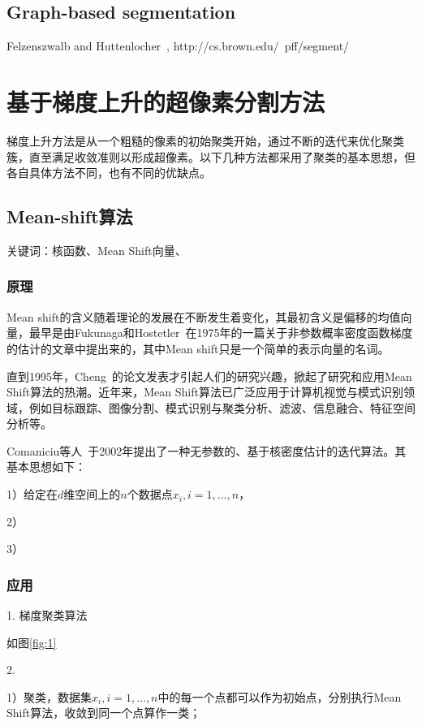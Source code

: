 \documentclass[12pt]{article}
\begin{document}
\subsection{Graph-based segmentation}

Felzenszwalb and Huttenlocher~\cite{8}, 
http://cs.brown.edu/~pff/segment/

\section{基于梯度上升的超像素分割方法}

梯度上升方法是从一个粗糙的像素的初始聚类开始，通过不断的迭代来优化聚类簇，直至满足收敛准则以形成超像素。以下几种方法都采用了聚类的基本思想，但各自具体方法不同，也有不同的优缺点。

\subsection{Mean-shift算法}

关键词：核函数、Mean Shift向量、

\subsubsection{原理}

Mean shift的含义随着理论的发展在不断发生着变化，其最初含义是偏移的均值向量，最早是由Fukunaga和Hostetler~\cite{6}在1975年的一篇关于非参数概率密度函数梯度的估计的文章中提出来的，其中Mean shift只是一个简单的表示向量的名词。

直到1995年，Cheng~\cite{7}的论文发表才引起人们的研究兴趣，掀起了研究和应用Mean Shift算法的热潮。近年来，Mean Shift算法已广泛应用于计算机视觉与模式识别领域，例如目标跟踪、图像分割、模式识别与聚类分析、滤波、信息融合、特征空间分析等。

Comaniciu等人~\cite{5}于2002年提出了一种无参数的、基于核密度估计的迭代算法。其基本思想如下：

1）给定在$d$维空间上的$n$个数据点$x_i, i = 1, \ldots, n$，

2）

3）

\subsubsection{应用}

1. 梯度聚类算法

如图\ref{fig:1}

2. 

1）聚类，数据集${x_i, i = 1, \ldots, n}$中的每一个点都可以作为初始点，分别执行Mean Shift算法，收敛到同一个点算作一类；
\end{document}
